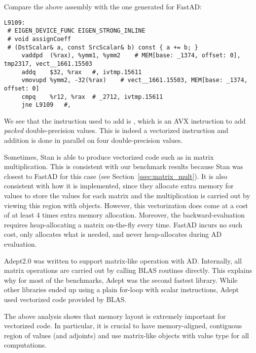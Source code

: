 Compare the above assembly with the one generated for FastAD:
\begin{lstlisting}[style=customasm]
 L9109:
 # EIGEN_DEVICE_FUNC EIGEN_STRONG_INLINE 
 # void assignCoeff
 # (DstScalar& a, const SrcScalar& b) const { a += b; }
     vaddpd  (%rax), %ymm1, %ymm2    # MEM[base: _1374, offset: 0], tmp2317, vect__1661.15503
     addq    $32, %rax   #, ivtmp.15611
     vmovupd %ymm2, -32(%rax)    # vect__1661.15503, MEM[base: _1374, offset: 0]
     cmpq    %r12, %rax  # _2712, ivtmp.15611
     jne L9109   #,
\end{lstlisting}
We see that the instruction used to add is ,
which is an AVX instruction to add \emph{packed} double-precision values.
This is indeed a vectorized instruction and addition is done in parallel
on four double-precision values.

Sometimes, Stan is able to produce vectorized code such as in matrix multiplication.
This is consistent with our benchmark results because Stan was closest to FastAD
for this case (see Section~\ref{ssec:matrix_mult}).
It is also consistent with how it is implemented,
since they allocate extra memory for  values to store the values for each matrix 
and the multiplication is carried out by viewing this region with  objects.
However, this vectorization does come at a cost of at least 4 times extra memory allocation.
Moreover, the backward-evaluation requires heap-allocating a matrix on-the-fly every time.
FastAD incurs no such cost, only allocates what is needed, and never heap-allocates during AD evaluation.

Adept2.0 was written to support matrix-like operation with AD.\@
Internally, all matrix operations are carried out by calling BLAS routines directly.
This explains why for most of the benchmarks, Adept was the second fastest library.
While other libraries ended up using a plain for-loop with scalar instructions,
Adept used vectorized code provided by BLAS.\@

The above analysis shows that memory layout is extremely important for vectorized code.
In particular, it is crucial to have memory-aligned, contiguous region of values (and adjoints)
and use  matrix-like objects with  value type for all computations.
